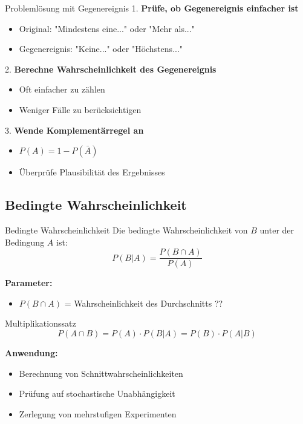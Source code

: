 \begin{KR}{Problemlösung mit Gegenereignis}
1. \textbf{Prüfe, ob Gegenereignis einfacher ist}
   \begin{itemize}
   \item Original: "Mindestens eine..." oder "Mehr als..."
   \item Gegenereignis: "Keine..." oder "Höchstens..."
   \end{itemize}

2. \textbf{Berechne Wahrscheinlichkeit des Gegenereignis}
   \begin{itemize}
   \item Oft einfacher zu zählen
   \item Weniger Fälle zu berücksichtigen
   \end{itemize}

3. \textbf{Wende Komplementärregel an}
   \begin{itemize}
   \item $P(A) = 1 - P(\bar{A})$
   \item Überprüfe Plausibilität des Ergebnisses
   \end{itemize}
\end{KR}

\subsection{Bedingte Wahrscheinlichkeit}

\begin{definition}{Bedingte Wahrscheinlichkeit}
Die bedingte Wahrscheinlichkeit von $B$ unter der Bedingung $A$ ist:
$$P(B|A)=\frac{P(B \cap A)}{P(A)}$$

\textbf{Parameter:}
\begin{itemize}
    \item $P(B \cap A)$ = Wahrscheinlichkeit des Durchschnitts ??
\end{itemize}
\end{definition}

\begin{theorem}{Multiplikationssatz}
$$P(A \cap B)=P(A) \cdot P(B|A)=P(B) \cdot P(A|B)$$

\textbf{Anwendung:}
\begin{itemize}
    \item Berechnung von Schnittwahrscheinlichkeiten
    \item Prüfung auf stochastische Unabhängigkeit
    \item Zerlegung von mehrstufigen Experimenten
\end{itemize}
\end{theorem}

